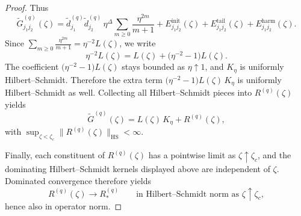 \documentclass[10pt,a4paper]{amsart}
\newcommand{\HS}{\mathrm{HS}}
\begin{document}
\begin{proof}
	Thus
	\[
		\widetilde G^{(q)}_{j_1j_2}(\zeta)
		=
		\widetilde d^{(q)}_{j_1}\widetilde d^{(q)}_{j_2}\,\eta^\Delta
		\sum_{m\ge0}\frac{\eta^{2m}}{m+1}
		+
		E^{\mathrm{init}}_{j_1j_2}(\zeta)
		+
		E^{\mathrm{tail}}_{j_1j_2}(\zeta)
		+
		E^{\mathrm{harm}}_{j_1j_2}(\zeta).
	\]
	Since \(\sum_{m\ge0}\frac{\eta^{2m}}{m+1}=\eta^{-2}L(\zeta)\), we write
	\[
		\eta^{-2}L(\zeta)=L(\zeta)+\bigl(\eta^{-2}-1\bigr)L(\zeta).
	\]
	The coefficient \(\bigl(\eta^{-2}-1\bigr)L(\zeta)\) stays bounded as
\(\eta\uparrow1\), and \(K_\eta\) is uniformly Hilbert--Schmidt. Therefore the
extra term $\bigl(\eta^{-2}-1\bigr)L(\zeta)\,K_\eta$
is uniformly Hilbert--Schmidt as well. Collecting all Hilbert--Schmidt pieces
into \(R^{(q)}(\zeta)\) yields
\[
    \widetilde G^{(q)}(\zeta)=L(\zeta)\,K_\eta+R^{(q)}(\zeta),
\]
with \(\sup_{\zeta<\zeta_c}\|R^{(q)}(\zeta)\|_{\HS}<\infty\).

 Finally, each constituent of \(R^{(q)}(\zeta)\) has a pointwise
	limit as \(\zeta\uparrow\zeta_c\), and the dominating Hilbert--Schmidt kernels
	displayed above are independent of \(\zeta\).  Dominated convergence therefore
	yields
	\[
	 R^{(q)}(\zeta)\to R_*^{(q)}
		\qquad\text{in Hilbert--Schmidt norm as }\zeta\uparrow\zeta_c,
	\]
	hence also in operator norm.
\end{proof}
\end{document}

